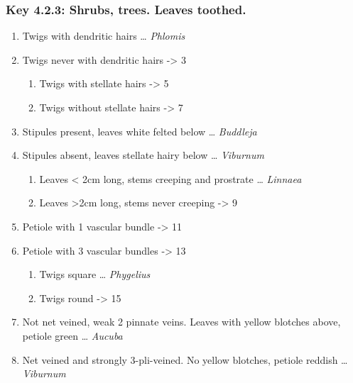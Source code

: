 \documentclass[openany]{book}
\providecommand{\tightlist}{%
  \setlength{\itemsep}{0pt}\setlength{\parskip}{0pt}}
\begin{document}
\hypertarget{key-4.2.3-shrubs-trees.-leaves-toothed.-1}{%
\subsubsection{Key 4.2.3: Shrubs, trees. Leaves
toothed.}\label{key-4.2.3-shrubs-trees.-leaves-toothed.-1}}

\begin{enumerate}
\def\labelenumi{\arabic{enumi}.}
\tightlist
\item
  Twigs with dendritic hairs \ldots{} \emph{Phlomis}
\item
  Twigs never with dendritic hairs -\textgreater{} 3

  \begin{enumerate}
  \def\labelenumii{\arabic{enumii}.}
  \setcounter{enumii}{2}
  \tightlist
  \item
    Twigs with stellate hairs -\textgreater{} 5
  \item
    Twigs without stellate hairs -\textgreater{} 7
  \end{enumerate}
\item
  Stipules present, leaves white felted below \ldots{} \emph{Buddleja}
\item
  Stipules absent, leaves stellate hairy below \ldots{} \emph{Viburnum}

  \begin{enumerate}
  \def\labelenumii{\arabic{enumii}.}
  \setcounter{enumii}{6}
  \tightlist
  \item
    Leaves \textless{} 2cm long, stems creeping and prostrate \ldots{}
    \emph{Linnaea}
  \item
    Leaves \textgreater{}2cm long, stems never creeping -\textgreater{}
    9
  \end{enumerate}
\item
  Petiole with 1 vascular bundle -\textgreater{} 11
\item
  Petiole with 3 vascular bundles -\textgreater{} 13

  \begin{enumerate}
  \def\labelenumii{\arabic{enumii}.}
  \setcounter{enumii}{10}
  \tightlist
  \item
    Twigs square \ldots{} \emph{Phygelius}
  \item
    Twigs round -\textgreater{} 15
  \end{enumerate}
\item
  Not net veined, weak 2 pinnate veins. Leaves with yellow blotches
  above, petiole green \ldots{} \emph{Aucuba}
\item
  Net veined and strongly 3-pli-veined. No yellow blotches, petiole
  reddish \ldots{} \emph{Viburnum}


\end{enumerate}
\end{document}
